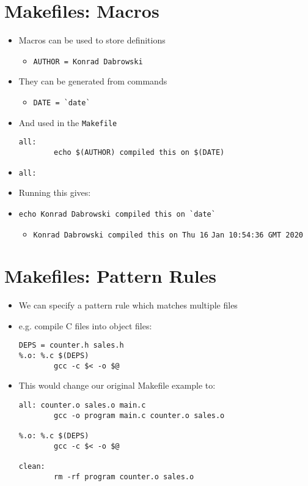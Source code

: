 \documentclass{article}
\begin{document}
\section{Makefiles: Macros}
\begin{itemize}
\item Macros can be used to store definitions
\begin{itemize}
\item \verb!AUTHOR = Konrad Dabrowski!
\end{itemize}
\item They can be generated from commands
\begin{itemize}
\item \verb!DATE = `date`!
\end{itemize}
\item And used in the \verb!Makefile!
\begin{verbatim}
all:
        echo $(AUTHOR) compiled this on $(DATE)
\end{verbatim}
\item \verb!all:!
\item Running this gives:
\item \verb!echo Konrad Dabrowski compiled this on `date`!
\begin{itemize}
\item \verb!Konrad Dabrowski compiled this on Thu 16! \verb!Jan 10:54:36 GMT 2020!
\end{itemize}
\end{itemize}



\section{Makefiles: Pattern Rules}
\begin{itemize}
\item We can specify a pattern rule which matches multiple files
\item e.g. compile C files into object files:
\begin{verbatim}
DEPS = counter.h sales.h
%.o: %.c $(DEPS)
        gcc -c $< -o $@
\end{verbatim}
\item This would change our original Makefile example to:
\begin{verbatim}
all: counter.o sales.o main.c
        gcc -o program main.c counter.o sales.o

%.o: %.c $(DEPS)
        gcc -c $< -o $@

clean:
        rm -rf program counter.o sales.o
\end{verbatim}
\end{itemize}
\end{document}
